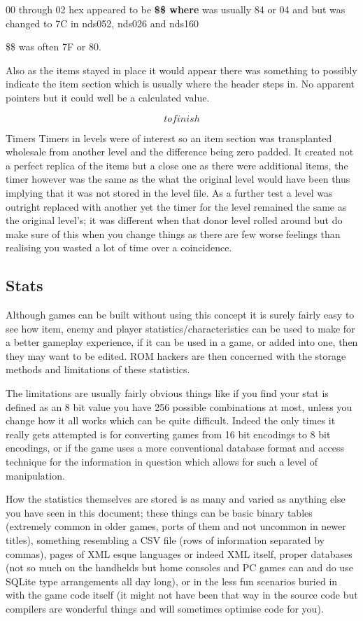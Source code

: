 \documentclass[
]{book}
\begin{document}
00 through 02 hex appeared to be \textbf{\$\$ where } was usually 84 or 04 and but was changed to 7C in nds052, nds026 and nds160

\$\$ was often 7F or 80.

Also as the items stayed in place it would appear there was something to possibly indicate the item section which is usually where the header steps in. No apparent pointers but it could well be a calculated value.

\[to finish\]

Timers Timers in levels were of interest so an item section was transplanted wholesale from another level and the difference being zero padded. It created not a perfect replica of the items but a close one as there were additional items, the timer however was the same as the what the original level would have been thus implying that it was not stored in the level file. As a further test a level was outright replaced with another yet the timer for the level remained the same as the original level's; it was different when that donor level rolled around but do make sure of this when you change things as there are few worse feelings than realising you wasted a lot of time over a coincidence.

\hypertarget{stats}{%
\subsection{Stats}\label{stats}}

Although games can be built without using this concept it is surely fairly easy to see how item, enemy and player statistics/characteristics can be used to make for a better gameplay experience, if it can be used in a game, or added into one, then they may want to be edited. ROM hackers are then concerned with the storage methods and limitations of these statistics.

The limitations are usually fairly obvious things like if you find your stat is defined as an 8 bit value you have 256 possible combinations at most, unless you change how it all works which can be quite difficult. Indeed the only times it really gets attempted is for converting games from 16 bit encodings to 8 bit encodings, or if the game uses a more conventional database format and access technique for the information in question which allows for such a level of manipulation.

How the statistics themselves are stored is as many and varied as anything else you have seen in this document; these things can be basic binary tables (extremely common in older games, ports of them and not uncommon in newer titles), something resembling a CSV file (rows of information separated by commas), pages of XML esque languages or indeed XML itself, proper databases (not so much on the handhelds but home consoles and PC games can and do use SQLite type arrangements all day long), or in the less fun scenarios buried in with the game code itself (it might not have been that way in the source code but compilers are wonderful things and will sometimes optimise code for you).
\end{document}
